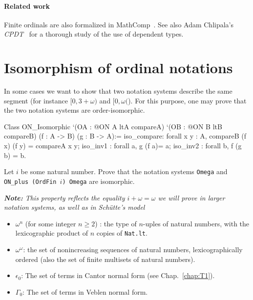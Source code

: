 \paragraph{Related work}
Finite ordinals are also formalized in MathComp~\cite{SSR}.  See also Adam Chlipala's \emph{CPDT}~\cite{chlipalacpdt2011} for a thorough study of the use of dependent types.


\section{Isomorphism of ordinal notations}


In some cases we want to show that two notation systems describe the same segment (for instance $[0,3+\omega)$ and $[0,\omega($). For this purpose, one may prove that the two notation systems are order-isomorphic.


\begin{Coqsrc}
Class  ON_Isomorphic 
       `(OA : @ON A ltA compareA)
       `(OB : @ON B ltB  compareB)
       (f : A -> B)
       (g : B -> A):=
  {
  iso_compare: forall x y : A,  compareB (f x) (f y) =
                                 compareA x y;
  iso_inv1 : forall a, g (f a)= a;
  iso_inv2 : forall b, f (g b) = b}.
\end{Coqsrc}


\begin{exercise}
Let $i$ be some natural number. Prove that the notation systems 
\texttt{Omega} and \texttt{ON\_plus (OrdFin $i$) Omega} are isomorphic.

{\it \textbf{Note:} This property reflects the equality $i+\omega=\omega$ we will prove in larger notation systems, as well as in Schütte's model}
\end{exercise}



\begin{itemize}
\item $\omega^n$ (for some  integer  $n\geq 2$) : the type of $n$-uples of natural numbers, with the lexicographic product of $n$ copies of \texttt{Nat.lt}.
\item  $\omega^\omega$: the set of nonincreasing sequences of natural numbers, lexicographically ordered (also the set of finite multisets of natural numbers).
\item $\epsilon_0$: The set of terms in Cantor normal form (see Chap.~\ref{chap:T1}).
\item $\Gamma_0$: The set of terms in Veblen normal form.
\end{itemize}




